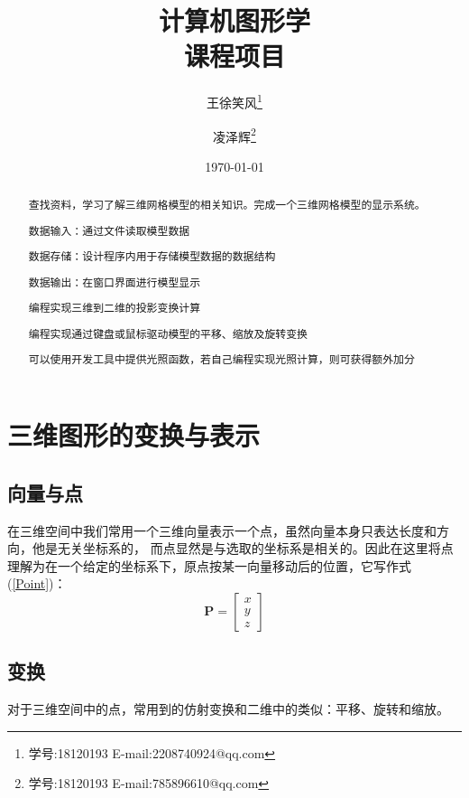 \documentclass[12pt,oneside,a4paper]{ctexart}
\begin{document}

\title{计算机图形学 \\ 课程项目}
\author{ 王徐笑风\thanks{学号:18120193 E-mail:2208740924@qq.com}
	\and 凌泽辉\thanks{学号:18120193 E-mail:785896610@qq.com}}
\date{\today}
\maketitle
\newpage
\tableofcontents
\newpage
\begin{abstract}
	查找资料，学习了解三维网格模型的相关知识。完成一个三维网格模型的显示系统。

	数据输入：通过文件读取模型数据

	数据存储：设计程序内用于存储模型数据的数据结构

	数据输出：在窗口界面进行模型显示

	编程实现三维到二维的投影变换计算

	编程实现通过键盘或鼠标驱动模型的平移、缩放及旋转变换

	可以使用开发工具中提供光照函数，若自己编程实现光照计算，则可获得额外加分
\end{abstract}

\section{三维图形的变换与表示}
\subsection{向量与点}
在三维空间中我们常用一个三维向量表示一个点，虽然向量本身只表达长度和方向，他是无关坐标系的，
而点显然是与选取的坐标系是相关的。因此在这里将点理解为在一个给定的坐标系下，原点按某一向量移动后的位置，它写作式(\ref{Point})：
\begin{equation}
	\mathbf{P} = \begin{bmatrix}
		x \\
		y \\
		z
	\end{bmatrix}
	\label{Point}
\end{equation}
\subsection{变换}
对于三维空间中的点，常用到的仿射变换和二维中的类似：平移、旋转和缩放。
\end{document}
